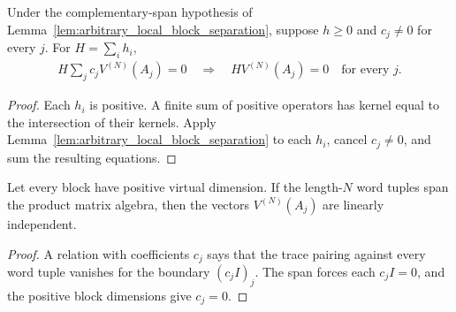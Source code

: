 \begin{lemma}
    \label{lem:arbitrary_positive_block_ground_states}
    \leanok
    Under the complementary-span hypothesis of
    Lemma~\ref{lem:arbitrary_local_block_separation}, suppose $h\ge0$ and
    $c_j\ne0$ for every $j$. For $H=\sum_i h_i$,
    \begin{align}
        H\sum_j c_jV^{(N)}(A_j)=0
        \quad\Longrightarrow\quad
        HV^{(N)}(A_j)=0\quad\text{for every }j.
        \label{eq:arbitrary_positive_block_ground_states}
    \end{align}
\end{lemma}
\begin{proof}\leanok
    Each $h_i$ is positive. A finite sum of positive operators has kernel equal
    to the intersection of their kernels. Apply
    Lemma~\ref{lem:arbitrary_local_block_separation} to each $h_i$, cancel
    $c_j\ne0$, and sum the resulting equations.
\end{proof}

\begin{lemma}
    \label{lem:periodic_block_linear_independence}
    \leanok
    Let every block have positive virtual dimension. If the length-$N$ word
    tuples span the product matrix algebra, then the vectors
    $V^{(N)}(A_j)$ are linearly independent.
\end{lemma}
\begin{proof}\leanok
    A relation with coefficients $c_j$ says that the trace pairing against
    every word tuple vanishes for the boundary $(c_j I)_j$. The span forces
    each $c_jI=0$, and the positive block dimensions give $c_j=0$.
\end{proof}

